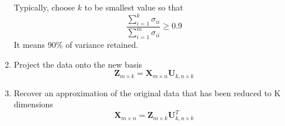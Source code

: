 \begin{enumerate}
    Typically, choose $k$ to be smallest value so that
    \begin{equation}
        \frac{\sum_{i=1}^k \sigma_{ii}}{\sum_{i=1}^m \sigma_{ii}} \geq 0.9
    \end{equation}
    It means $90\%$ of variance retained.

    \item Project the data onto the new basis
    \begin{equation}
        \mathbf{Z}_{m \times k} = \mathbf{X}_{m \times n} \mathbf{U}_{k, n \times k}
    \end{equation}
    
    \item Recover an approximation of the original data that has been reduced to K dimensions
    \begin{equation}
        \mathbf{X}_{m \times n} = \mathbf{Z}_{m \times k} \mathbf{U}_{k, n \times k}^T
    \end{equation}
\end{enumerate}
